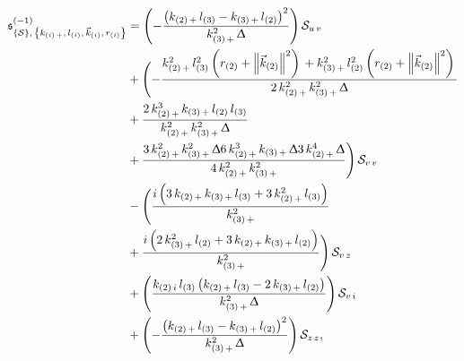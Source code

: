 \begin{equation}
  \begin{split}
    \ffs^{(-1)}_{\qty{\cS},\, \kmkrN{i}}
    & =
    \qty(%
      -
      \frac{%
        \qty(%
          k_{\qty(2)\, +}\, l_{\qty(3)}
          -
          k_{\qty(3)\, +}\, l_{\qty(2)}
        )^2
      }{%
        k_{\qty(3)\, +}^2\, \Delta
      }
    )\,
    \cS_{u\, v} 
    \\
    & +
    \Biggl(
      -
      \frac{%
        k_{\qty(2)\, +}^2\, l_{\qty(3)}^2\, \qty(r_{(2)} + \norm{\vec{k}_{(2)}}^2)\,
        +
        k_{\qty(3)\, +}^2\, l_{\qty(2)}^2\, \qty(r_{(2)} + \norm{\vec{k}_{(2)}}^2)\,
      }{%
        2\, k_{\qty(2)\, +}^2\, k_{\qty(3)\, +}^2\, \Delta
      }
      \\
      & +
      \frac{%
        2\, k_{\qty(2)\, +}^3\, k_{\qty(3)\, +}\, l_{\qty(2)}\, l_{\qty(3)}
      }{%
        k_{\qty(2)\, +}^2\, k_{\qty(3)\, +}^2\, \Delta
      }
      \\
      & +
      \frac{%
        3\, k_{\qty(2)\, +}^2\, k_{\qty(3)\, +}^2\, \Delta
        6\, k_{\qty(2)\, +}^3\, k_{\qty(3)\, +}\, \Delta
        3\, k_{\qty(2)\, +}^4\, \Delta
      }{%
        4\, k_{\qty(2)\, +}^2\, k_{\qty(3)\, +}^2
      }
    \Biggr)\,
    \cS_{v\, v} 
    \\
    & -
    \Biggl(%
      \frac{%
        i\, \qty(%
          3\, k_{\qty(2)\, +}\, k_{\qty(3)\, +}\, l_{\qty(3)}
          +
          3\, k_{\qty(2)\, +}^2\, l_{\qty(3)}
        )
      }{%
        k_{\qty(3)\, +}^2
      }
      \\
      & +
      \frac{%
        i\, \qty(%
          2\, k_{\qty(3)\, +}^2\, l_{\qty(2)}
          +
          3\, k_{\qty(2)\, +}\, k_{\qty(3)\, +}\, l_{\qty(2)}
        )
      }{%
        k_{\qty(3)\, +}^2
      }
    \Biggr)\,
    \cS_{v\, z} 
    \\
    & +
    \qty(%
      \frac{%
        k_{\qty(2)\, i}\, l_{\qty(3)}\,
        \qty(%
          k_{\qty(2)\, +}\, l_{\qty(3)}
          -
          2\, k_{\qty(3)\, +}\, l_{\qty(2)}
        )
      }{%
        k_{\qty(3)\, +}^2\, \Delta
      }
    )\,
    \cS_{v\,{i}} 
    \\
    & +
    \qty(%
      -
      \frac{%
        \qty(%
          k_{\qty(2)\, +}\, l_{\qty(3)}
          -
          k_{\qty(3)\, +}\, l_{\qty(2)}
        )^2
      }{%
        k_{\qty(3)\, +}^2\, \Delta
      }
    )\,
    \cS_{z\, z},
  \end{split}
\end{equation}
